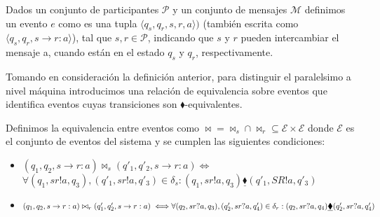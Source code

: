 \begin{definition}[Eventos] Dados un conjunto de participantes $\mathcal{P}$ y un conjunto de mensajes $\mathcal{M}$ definimos un evento $e$ como es una tupla $\langle q_s, q_r, s, r, a \rangle)$ (también escrita como $\langle q_s, q_r, s \rightarrow r:a \rangle$), tal que $s,r \in \mathcal{P}$, indicando que $s$ y $r$ pueden intercambiar el mensaje a, cuando están en el estado $q_s$ y $q_r$, respectivamente.
\end{definition}

Tomando en consideración la definición anterior, para distinguir el paralelsimo a nivel máquina introducimos una relación de equivalencia sobre eventos que identifica eventos cuyas transiciones son $\blacklozenge$-equivalentes.

\begin{definition} Definimos la equivalencia entre eventos como $\bowtie = \bowtie_s \cap \bowtie_r \subseteq \mathcal{E} \times \mathcal{E}$ donde $\mathcal{E}$ es el conjunto de eventos del sistema y se cumplen las siguientes condiciones:

\begin{itemize}
\item $(q_1, q_2, s \rightarrow r:a) \bowtie_s (q'_1, q'_2, s \rightarrow r:a) \iff$ \\ 
 $\forall (q_1, sr!a,q_3),(q'_1, sr!a,q'_3) \in \delta_s:(q_1, sr!a,q_3) \underline{\blacklozenge} (q'_1, SR!a,q'_3) $
\item $(q_1, q_2, s \rightarrow r:a) \bowtie_r (q'_1, q'_2, s \rightarrow r:a) \iff \\ 
\forall (q_2, sr?a,q_3),(q'_2, sr?a,q'_4) \in \delta_ r:(q_2, sr?a,q_4) \underline{\blacklozenge} (q'_2, sr?a,q'_4)$ \end{itemize}
\end{definition}
